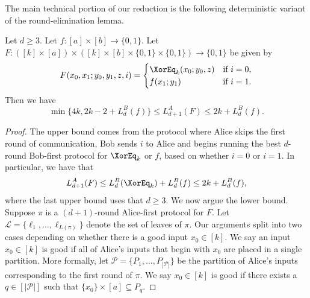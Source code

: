 The main technical portion of our reduction is the following deterministic variant of the round-elimination lemma.
\begin{lemma}\label{lem:round-elimination}
Let $d\ge3$. Let $f:[a]\times[b]\to\{0,1\}$. Let $F:([k]\times[a])\times([k]\times[b]\times\{0,1\}\times\{0,1\})\to\{0,1\}$ be given by
\[F(x_0,x_1;y_0,y_1,z,i)=\begin{cases}\XorEq_k(x_0;y_0,z)&\text{if }i=0,\\f(x_1;y_1)&\text{if }i=1.\end{cases}\]
Then we have
\[\min\{4k,2k-2+L_d^B(f)\}\le L_{d+1}^A(F)\le2k+L_d^B(f).\]
\end{lemma}
\begin{proof}
The upper bound comes from the protocol where Alice skips the first round of communication, Bob sends $i$ to Alice and begins running the best $d$-round Bob-first protocol for $\XorEq_k$ or $f$, based on whether $i=0$ or $i=1$. In particular, we have that
\[L_{d+1}^A(F)\le L_d^B(\XorEq_k)+L_d^B(f)\le2k+L_d^B(f),\]
where the last upper bound uses that $d\ge3$.
We now argue the lower bound. Suppose $\pi$ is a $(d+1)$-round Alice-first protocol for $F$. Let $\mathcal L=\{\ell_1,\ldots,\ell_{L(\pi)}\}$ denote the set of leaves of $\pi$.
Our arguments split into two cases depending on whether there is a good input $x_0\in[k]$. We say an input $x_0\in[k]$ is good if all of Alice's inputs that begin with $x_0$ are placed in a single partition. More formally, let $\mathcal P=\{P_1,\ldots,P_{|\mathcal P|}\}$ be the partition of Alice's inputs corresponding to the first round of $\pi$. We say $x_0\in[k]$ is good if there exists a $q\in[|\mathcal P|]$ such that $\{x_0\}\times[a]\subseteq P_q$.

\end{proof}
